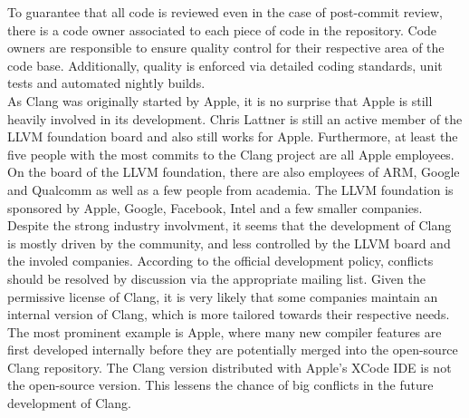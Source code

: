 To guarantee that all code is reviewed even in the case of post-commit review, there is a code owner associated to each piece of code in the repository. Code owners are responsible to ensure quality control for their respective area of the code base. Additionally, quality is enforced via detailed coding standards, unit tests and automated nightly builds. \\

As Clang was originally started by Apple, it is no surprise that Apple is still heavily involved in its development. Chris Lattner is still an active member of the LLVM foundation board and also still works for Apple.\cite{lattner} Furthermore, at least the five people with the most commits to the Clang project are all Apple employees.\cite{clang-commits} On the board of the LLVM foundation, there are also employees of ARM, Google and Qualcomm as well as a few people from academia.\cite{llvm-board} The LLVM foundation is sponsored by Apple, Google, Facebook, Intel and a few smaller companies.\cite{llvm-sponsors} \\

Despite the strong industry involvment, it seems that the development of Clang is mostly driven by the community, and less controlled by the LLVM board and the involed companies. According to the official development policy, conflicts should be resolved by discussion via the appropriate mailing list.\cite{clang-policy} Given the permissive license of Clang, it is very likely that some companies maintain an internal version of Clang, which is more tailored towards their respective needs. The most prominent example is Apple, where many new compiler features are first developed internally before they are potentially merged into the open-source Clang repository. The Clang version distributed with Apple's XCode IDE is not the open-source version. \cite{Clang in XCODE}
 This lessens the chance of big conflicts in the future development of Clang. 


